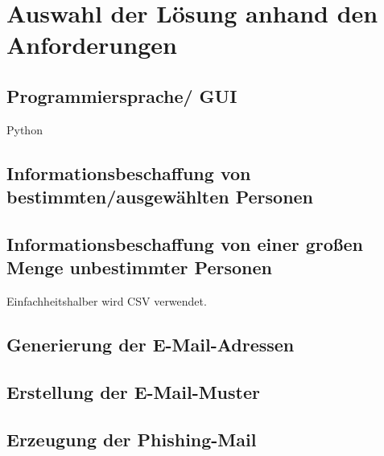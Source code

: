 

\chapter{Auswahl der Lösung anhand den Anforderungen}  %
\label{cha:Auswahl der Lösung anhand Anforderungen} %
\section{Programmiersprache/ GUI}
Python
\section{Informationsbeschaffung von bestimmten/ausgewählten Personen}
	
\section{Informationsbeschaffung von einer großen Menge unbestimmter Personen}
Einfachheitshalber wird CSV verwendet.
\section{Generierung der E-Mail-Adressen}

\section{Erstellung der E-Mail-Muster}

\section{Erzeugung der Phishing-Mail}